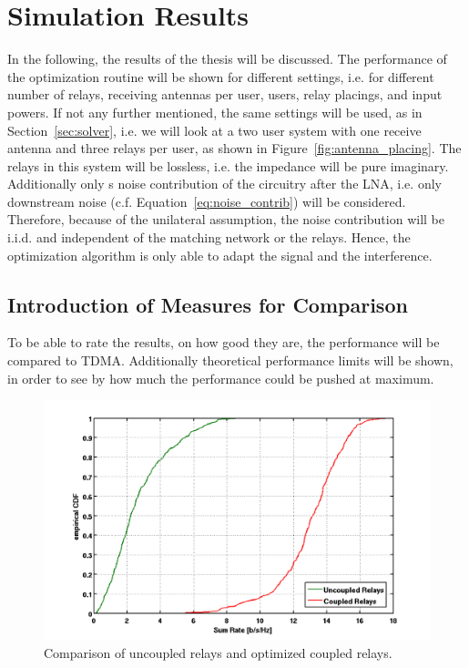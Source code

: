 \chapter{Simulation Results}
\label{sec:results}

In the following, the results of the thesis will be discussed.
The performance of the optimization routine will be shown for different settings, i.e. for different number of relays, receiving antennas per user, users, relay placings, and input powers.
If not any further mentioned, the same settings will be used, as in Section~\ref{sec:solver}, i.e.
we will look at a two user system with one receive antenna and three relays per user, as shown in Figure~\ref{fig:antenna_placing}.
The relays in this system will be lossless, i.e. the impedance will be pure imaginary.
Additionally only s noise contribution of the circuitry after the LNA, i.e. only downstream noise (c.f. Equation~\eqref{eq:noise_contrib}) will be considered.
Therefore, because of the unilateral assumption, the noise contribution will be i.i.d. and independent of the matching network or the relays.
Hence, the optimization algorithm is only able to adapt the signal and the interference.

\section{Introduction of Measures for Comparison}
\label{sec:measures}
To be able to rate the results, on how good they are, the performance will be compared to TDMA.
Additionally theoretical performance limits will be shown, in order to see by how much the performance could be pushed at maximum.
\begin{figure}[h]
\centering
  \includegraphics[width=0.7\linewidth]{images/Coupledcomparison.png}
\caption{Comparison of uncoupled relays and optimized coupled relays.}
\label{fig:coupledcomparison}
\end{figure}

